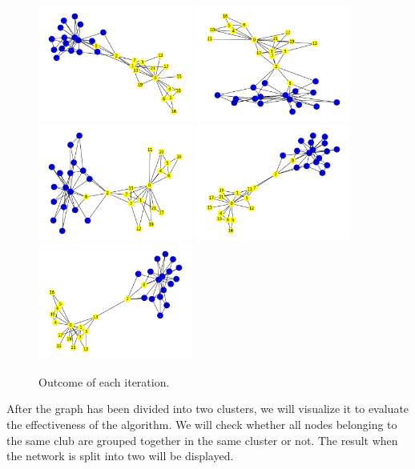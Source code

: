 \documentclass[12pt]{article}
\begin{document}
\begin{figure}
{\includegraphics[width = 2in]{Figure_7.png}} 
{\includegraphics[width = 2in]{Figure_8.png}} 
{\includegraphics[width = 2in]{Figure_9.png}} 
{\includegraphics[width = 2in]{Figure_10.png}} 
{\includegraphics[width = 2in]{Figure_11.png}} 
\caption{Outcome of each iteration.}
\label{some example}
\end{figure}
\clearpage

After the graph has been divided into two clusters, we will visualize it to evaluate the effectiveness of the algorithm. We will check whether all nodes belonging to the same club are grouped together in the same cluster or not. The result when the network is split into two will be displayed.
\end{document}
